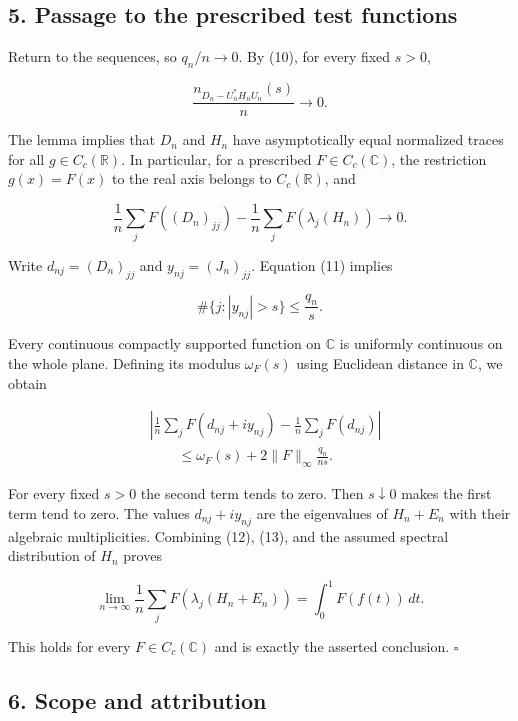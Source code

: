 \documentclass[10pt,a4paper]{article}
\begin{document}
\subsection{5. Passage to the prescribed test
functions}\label{passage-to-the-prescribed-test-functions}

Return to the sequences, so \(q_n/n\to0\). By (10), for every fixed
\(s>0\),

\[\frac{n_{D_n-U_n^*H_nU_n}(s)}n\longrightarrow0.\]

The lemma implies that \(D_n\) and \(H_n\) have asymptotically equal
normalized traces for all \(g\in C_c(\mathbb R)\). In particular, for a
prescribed \(F\in C_c(\mathbb C)\), the restriction \(g(x)=F(x)\) to the
real axis belongs to \(C_c(\mathbb R)\), and

\[\frac1n\sum_jF((D_n)_{jj})-\frac1n\sum_jF(\lambda_j(H_n))\longrightarrow0.\tag{12}\]

Write \(d_{nj}=(D_n)_{jj}\) and \(y_{nj}=(J_n)_{jj}\). Equation (11)
implies

\[\#\{j:|y_{nj}|>s\}\le\frac{q_n}{s}.\]

Every continuous compactly supported function on \(\mathbb C\) is
uniformly continuous on the whole plane. Defining its modulus
\(\omega_F(s)\) using Euclidean distance in \(\mathbb C\), we obtain

\[\begin{aligned}
&\left|\frac1n\sum_jF(d_{nj}+iy_{nj})-\frac1n\sum_jF(d_{nj})\right|\\
&\hspace{2em}\le\omega_F(s)+2\|F\|_\infty\frac{q_n}{ns}.
\end{aligned}\tag{13}\]

For every fixed \(s>0\) the second term tends to zero. Then
\(s\downarrow0\) makes the first term tend to zero. The values
\(d_{nj}+iy_{nj}\) are the eigenvalues of \(H_n+E_n\) with their
algebraic multiplicities. Combining (12), (13), and the assumed spectral
distribution of \(H_n\) proves

\[\lim_{n\to\infty}\frac1n\sum_jF(\lambda_j(H_n+E_n))
=\int_0^1F(f(t))\,dt.\]

This holds for every \(F\in C_c(\mathbb C)\) and is exactly the asserted
conclusion. \(\square\)

\subsection{6. Scope and attribution}\label{scope-and-attribution}
\end{document}
